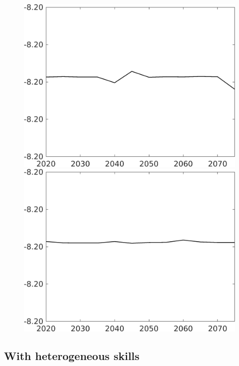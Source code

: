 \documentclass[12pt]{article}
\begin{document}
\begin{figure}[h!!]
\begin{minipage}[]{0.32\textwidth}
	\end{minipage}	
	\begin{minipage}[]{0.32\textwidth}
		\includegraphics[width=1\textwidth]{../../codding_model/own_basedOnFried/optimalPol_010922_revision/figures/all_13Sept22/CompTaul_LFBAUPer_Reg0_Lg_spillover0_nsk1_xgr0_knspil1_sep1_countec0_GovRev0_etaa0.79.png}
	\end{minipage}	
	\begin{minipage}[]{0.32\textwidth}
		\includegraphics[width=1\textwidth]{../../codding_model/own_basedOnFried/optimalPol_010922_revision/figures/all_13Sept22/CompTaul_LFBAUPer_Reg0_Ln_spillover0_nsk1_xgr0_knspil1_sep1_countec0_GovRev0_etaa0.79.png}
	\end{minipage}	
\end{figure}

\clearpage
\newpage
\subsection{With heterogeneous skills}
\end{document}
